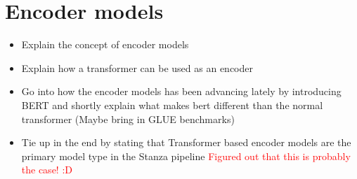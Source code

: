 \section{Encoder models} \label{sec:ED}

\begin{itemize}
    \item Explain the concept of encoder models
    \item Explain how a transformer can be used as an encoder
    \item Go into how the encoder models has been advancing lately by introducing BERT and shortly explain what makes bert different than the normal transformer (Maybe bring in GLUE benchmarks)
    \item Tie up in the end by stating that Transformer based encoder models are the primary model type in the Stanza pipeline \textcolor{red}{Figured out that this is probably the case! :D}
\end{itemize}




